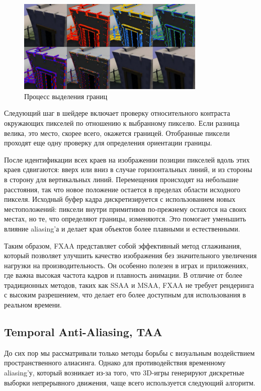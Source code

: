 \begin{figure}[H]
    \centering
    \includegraphics[width = 9cm]{8.png}
    \caption{Процесс выделения границ}
    \label{fig:float}
\end{figure}

Следующий шаг в шейдере включает проверку относительного контраста окружающих пикселей по отношению к выбранному пикселю. Если разница велика, это место, скорее всего, окажется границей. Отобранные пиксели проходят еще одну проверку для определения ориентации границы.

После идентификации всех краев на изображении позиции пикселей вдоль этих краев сдвигаются: вверх или вниз в случае горизонтальных линий, и из стороны в сторону для вертикальных линий. Перемещения происходят на небольшие расстояния, так что новое положение остается в пределах области исходного пикселя. Исходный буфер кадра дискретизируется с использованием новых местоположений: пиксели внутри примитивов по-прежнему остаются на своих местах, но те, что определяют границы, изменяются. Это помогает уменьшить влияние aliasing'а и делает края объектов более плавными и естественными.

Таким образом, FXAA представляет собой эффективный метод сглаживания, который позволяет улучшить качество изображения без значительного увеличения нагрузки на производительность. Он особенно полезен в играх и приложениях, где важна высокая частота кадров и плавность анимации. В отличие от более традиционных методов, таких как SSAA и MSAA, FXAA не требует рендеринга с высоким разрешением, что делает его более доступным для использования в реальном времени.

\subsection{Temporal Anti-Aliasing, TAA}
До сих пор мы рассматривали только методы борьбы с визуальным воздействием пространственного алиасинга. Однако для противодействия временному aliasing'у, который возникает из-за того, что 3D-игры генерируют дискретные выборки непрерывного движения, чаще всего используется следующий алгоритм.


